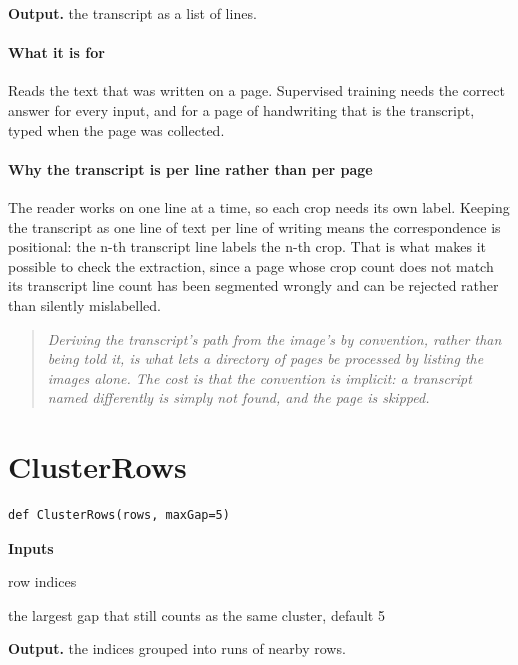 \noindent\textbf{Output.} the transcript as a list of lines.


\paragraph{What it is for}
Reads the text that was written on a page. Supervised training needs the correct answer for every input, and for a page of handwriting that is the transcript, typed when the page was collected.


\paragraph{Why the transcript is per line rather than per page}
The reader works on one line at a time, so each crop needs its own label. Keeping the transcript as one line of text per line of writing means the correspondence is positional: the n-th transcript line labels the n-th crop. That is what makes it possible to check the extraction, since a page whose crop count does not match its transcript line count has been segmented wrongly and can be rejected rather than silently mislabelled.


\begin{quote}\small\itshape Deriving the transcript's path from the image's by convention, rather than being told it, is what lets a directory of pages be processed by listing the images alone. The cost is that the convention is implicit: a transcript named differently is simply not found, and the page is skipped.\end{quote}

\section{ClusterRows}
\begin{lstlisting}[style=sig]
def ClusterRows(rows, maxGap=5)
\end{lstlisting}

\noindent\textbf{Inputs}
\begin{description}[leftmargin=2.2em,style=nextline,font=\normalfont\ttfamily]\setlength\itemsep{1pt}
  \item[{rows}] \normalfont row indices
  \item[{maxGap}] \normalfont the largest gap that still counts as the same cluster, default 5
\end{description}

\noindent\textbf{Output.} the indices grouped into runs of nearby rows.


